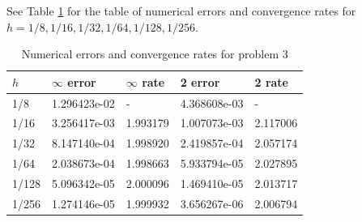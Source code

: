 \documentclass{homework}
\begin{document}
\begin{alphaparts}
		\questionpart See Table \ref{table:p3d} for the table of numerical errors and convergence rates for $h = 1/8, 1/16, 1/32, 1/64, 1/128, 1/256$.
		
		\begin{table}[h]
			\centering
			\begin{tabular}{@{}lllll@{}}
				\toprule
				$h$ & $\infty$ error & $\infty$ rate & 2 error & 2 rate \\
				\midrule
				1/8  &	1.296423e-02&	-        &	4.368608e-03&	-        \\
				1/16 & 	3.256417e-03&	1.993179&	1.007073e-03&	2.117006\\
				1/32  &	8.147140e-04&	1.998920&	2.419857e-04&	2.057174\\
				1/64 & 	2.038673e-04&	1.998663&	5.933794e-05&	2.027895\\
				1/128& 	5.096342e-05&	2.000096&	1.469410e-05&	2.013717\\
				1/256& 	1.274146e-05&	1.999932&	3.656267e-06&	2.006794\\
				\bottomrule
			\end{tabular}
			\caption{Numerical errors and convergence rates for problem 3}
			\label{table:p3d}
		\end{table}
	\end{alphaparts}
		
\end{document}

